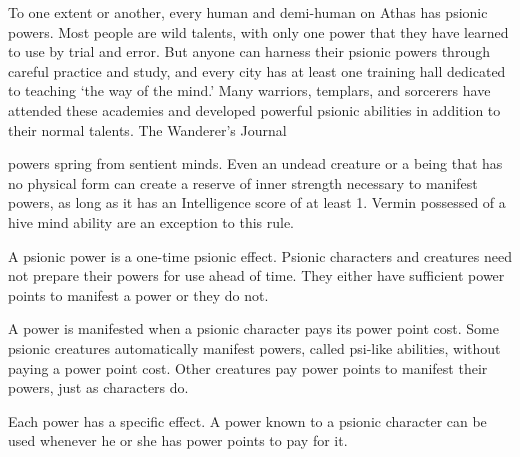 {To one extent or another, every human and demi-human on Athas has psionic powers. Most people are wild talents, with only one power that they have learned to use by trial and error. But anyone can harness their psionic powers through careful practice and study, and every city has at least one training hall dedicated to teaching `the way of the mind.' Many warriors, templars, and sorcerers have attended these academies and developed powerful psionic abilities in addition to their normal talents.}
{The Wanderer's Journal}

 powers spring from sentient minds. Even an undead creature or a being that has no physical form can create a reserve of inner strength necessary to manifest powers, as long as it has an Intelligence score of at least 1. Vermin possessed of a hive mind ability are an exception to this rule.

A psionic power is a one-time psionic effect. Psionic characters and creatures need not prepare their powers for use ahead of time. They either have sufficient power points to manifest a power or they do not.

A power is manifested when a psionic character pays its power point cost. Some psionic creatures automatically manifest powers, called psi-like abilities, without paying a power point cost. Other creatures pay power points to manifest their powers, just as characters do.

Each power has a specific effect. A power known to a psionic character can be used whenever he or she has power points to pay for it.




